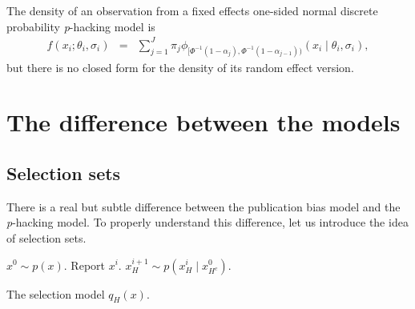 \documentclass[useAMS,usenatbib,referee]{biom}
\begin{document}
The density of an observation from a fixed effects one-sided normal discrete probability \textit{p}-hacking model is
\begin{eqnarray}
f(x_{i};\theta_{i},\sigma_{i}) & = & \sum_{j=1}^{J}\pi_{j}\phi_{[\Phi^{-1}(1-\alpha_{j}),\Phi^{-1}(1-\alpha_{j-1}))}(x_{i}\mid\theta_{i},\sigma_{i}),\label{eq:Fixed effects, p-hacking}
\end{eqnarray}
but there is no closed form for the density of its random effect version.

\section{The difference between the models}\label{sect:differences}

\subsection{Selection sets\label{sec:Selection Sets}}
There is a real but subtle difference between the publication bias model and the \textit{p}-hacking model. To properly understand this difference, let us introduce the idea of selection sets.

\begin{algorithm}[!h]
\begin{algorithmic}[1]
	\State $x^{0}\sim p(x)$.
			\State Report $x^i$.           
		\Else         
			\State $x_{H}^{i+1}\sim p(x_{H}^{i}\mid x_{H^{c}}^{0})$.        
		\EndIf  
	\EndFor  
\end{algorithmic}
\caption{\label{alg:Selection model}The selection model $q_{H}(x)$.}
\end{algorithm}
\end{document}
